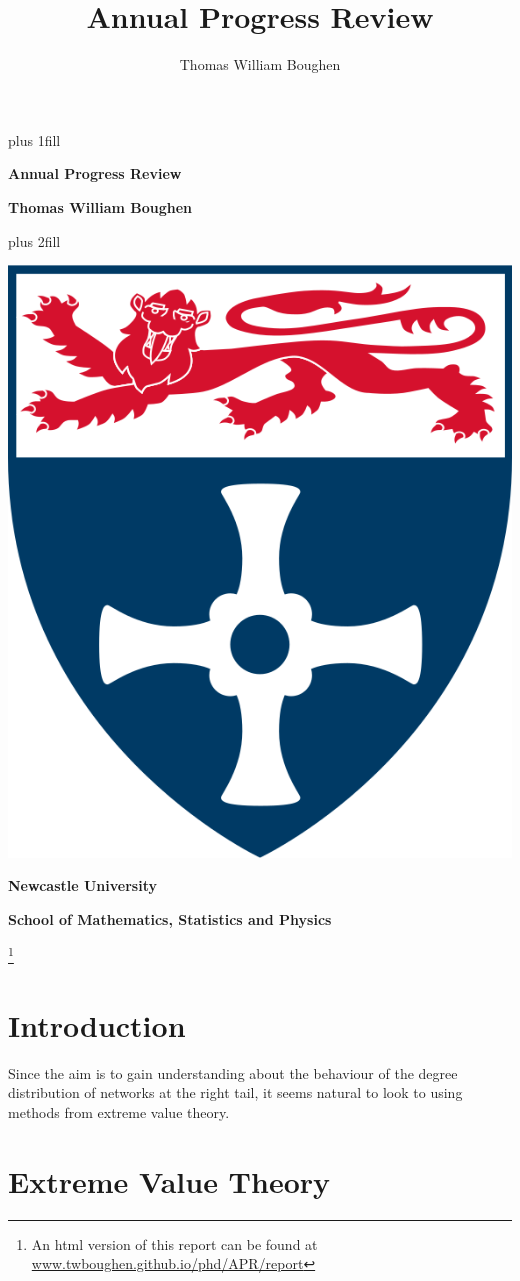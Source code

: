 \documentclass[
  10pt,
  a4paper,
]{scrreprt}
\title{Annual Progress Review}
\author{Thomas William Boughen}
\date{}
\theoremstyle{plain}
\theoremstyle{definition}
\theoremstyle{remark}
\begin{document}
\cleardoublepage
\thispagestyle{empty}
{\centering
\hbox{}\vskip 0cm plus 1fill
{\Huge\bfseries Annual Progress Review \par}
\vspace{12ex}
{\Large\bfseries Thomas William Boughen \par}
\vspace{3ex}
\vskip 0cm plus 2fill
\vspace{3ex}
{\bfseries\large  \par}
\vspace{12ex}
{\includegraphics[width=0.1\linewidth]{"imgs/University_of_Newcastle_Coat_of_Arms.png"}\par}
%
%
{\bfseries\large Newcastle University \par}
\vspace{3ex}
%
{\bfseries\large School of Mathematics, Statistics and Physics \par}
%
\vspace{12ex}
\footnote{An html version of this report can be found at \url{www.twboughen.github.io/phd/APR/report}}
\justifying
\noindent\ifdefined\Shaded\renewenvironment{Shaded}{\begin{tcolorbox}[interior hidden, frame hidden, boxrule=0pt, sharp corners, enhanced, breakable, borderline west={3pt}{0pt}{shadecolor}]}{\end{tcolorbox}}\fi

\hypertarget{sec-int}{%
\chapter{Introduction}\label{sec-int}}

Since the aim is to gain understanding about the behaviour of the degree
distribution of networks at the right tail, it seems natural to look to
using methods from extreme value theory.

\hypertarget{sec-ext}{%
\chapter{Extreme Value Theory}\label{sec-ext}}

}
\end{document}
